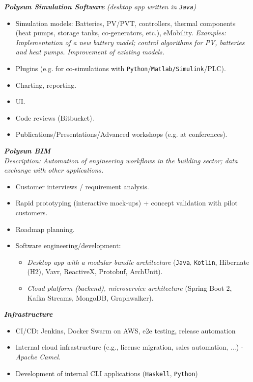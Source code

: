 \documentclass[11pt,a4paper,ngerman,sans]{moderncv}
\begin{document}
{
	\textbf{\emph{Polysun Simulation Software}} \emph{(desktop app written in \texttt{Java})}
  \begin{itemize}
    \item Simulation models: Batteries, PV/PVT, controllers, thermal components 
      (heat pumps, storage tanks, co-generators, etc.), eMobility.
      \emph{Examples: Implementation of a new battery model; control algorithms for PV, batteries and heat pumps. Improvement of existing models.}
    \item Plugins (e.g. for co-simulations with \texttt{Python}/\texttt{Matlab/Simulink}/PLC).
    \item Charting, reporting.
    \item UI. 
    \item Code reviews (Bitbucket).
    \item Publications/Presentations/Advanced workshops (e.g. at conferences).
      \\
  \end{itemize}
	\textbf{\emph{Polysun BIM}} 
  \\
	\emph{Description: Automation of engineering workflows in the building sector; 
	data exchange with other applications.}
  \begin{itemize}
    \item Customer interviews / requirement analysis.
    \item Rapid prototyping (interactive mock-ups) + concept validation with pilot customers.
    \item Roadmap planning.
    \item Software engineering/development:
      \begin{itemize}
        \item \emph{Desktop app with a modular bundle architecture} 
          (\texttt{Java}, \texttt{Kotlin}, Hibernate (H2), Vavr, ReactiveX, Protobuf, ArchUnit).
        \item \emph{Cloud platform (backend), microservice architecture} (Spring Boot 2, Kafka Streams, MongoDB, Graphwalker).
          \\
      \end{itemize}
  \end{itemize}
  \textbf{\emph{Infrastructure}}
  \begin{itemize}
    \item CI/CD: Jenkins, Docker Swarm on AWS, e2e testing, release automation
    \item Internal cloud infrastructure (e.g., license migration, sales automation, ...) - \emph{Apache Camel}.	
    \item Development of internal CLI applications (\texttt{Haskell}, \texttt{Python})
      \\
  \end{itemize}
}
{}
\end{document}
